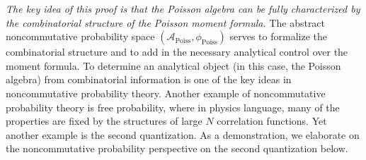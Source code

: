 \documentclass[a4paper,11pt]{article}
\theoremstyle{definition}
\numberwithin{equation}{section}
\begin{document}
{\it The key idea of this proof is that the Poisson algebra can be fully characterized by the combinatorial structure of the Poisson moment formula.} The abstract noncommutative probability space $(\mathcal{A}_\text{Poiss}, \phi_\text{Poiss})$ serves to formalize the combinatorial structure and to add in the necessary analytical control over the moment formula. To determine an analytical object (in this case, the Poisson algebra) from combinatorial information is one of the key ideas in noncommutative probability theory. Another example of noncommutative probability theory is free probability, where in physics language, many of the properties are fixed by the structures of large $N$ correlation functions. Yet another example is the second quantization. As a demonstration, we elaborate on the noncommutative probability perspective on the second quantization below.



    
    
    
 
\end{document}
